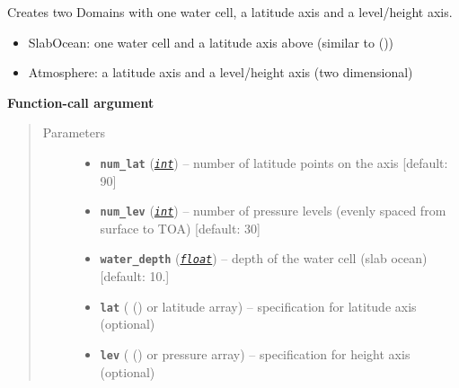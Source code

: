 \documentclass[a4paper,10pt,english]{sphinxmanual}
\begin{document}
\begin{fulllineitems}
\label{api/climlab.domain:climlab.domain.domain.zonal_mean_column}
Creates two Domains with one water cell, a latitude axis and 
a level/height axis.
\begin{itemize}
\item {} 
SlabOcean:    one water cell and a latitude axis above 
(similar to {\hyperref[api/climlab.domain:climlab.domain.domain.zonal_mean_surface]{\emph{}}} ())

\item {} 
Atmosphere: a latitude axis and a level/height axis (two dimensional)

\end{itemize}

\textbf{Function-call argument}
\begin{quote}\begin{description}
\item[{Parameters}] \leavevmode\begin{itemize}
\item {} 
\textbf{\texttt{num\_lat}} (\href{http://docs.python.org/2.7/library/functions.html\#int}{\emph{\texttt{int}}}) -- number of latitude points on the axis
{[}default: 90{]}

\item {} 
\textbf{\texttt{num\_lev}} (\href{http://docs.python.org/2.7/library/functions.html\#int}{\emph{\texttt{int}}}) -- number of pressure levels
(evenly spaced from surface to TOA) {[}default: 30{]}

\item {} 
\textbf{\texttt{water\_depth}} (\href{http://docs.python.org/2.7/library/functions.html\#float}{\emph{\texttt{float}}}) -- depth of the water cell (slab ocean) {[}default: 10.{]}

\item {} 
\textbf{\texttt{lat}} ({\hyperref[api/climlab.domain:climlab.domain.axis.Axis]{\emph{}}} () or latitude array) -- specification for latitude axis (optional)

\item {} 
\textbf{\texttt{lev}} ({\hyperref[api/climlab.domain:climlab.domain.axis.Axis]{\emph{}}} () or pressure array) -- specification for height axis (optional)


\end{itemize}
\end{description}
\end{quote}
\end{fulllineitems}
\end{document}
